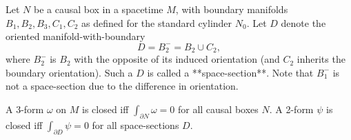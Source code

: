 Let $N$ be a causal box in a spacetime $M$, with boundary manifolds $B_1, B_2, B_3, C_1, C_2$ as defined for the standard cylinder $N_0$. Let $D$ denote the oriented manifold-with-boundary
$$D = B_2^- = B_2 \cup C_2,$$
where $B_2^-$ is $B_2$ with the opposite of its induced orientation (and $C_2$ inherits the boundary orientation). Such a $D$ is called a **space-section**. Note that $B_1^-$ is not a space-section due to the difference in orientation.

A 3-form $\omega$ on $M$ is closed iff $\int_{\partial N} \omega = 0$ for all causal boxes $N$. A 2-form $\psi$ is closed iff $\int_{\partial D} \psi = 0$ for all space-sections $D$.
